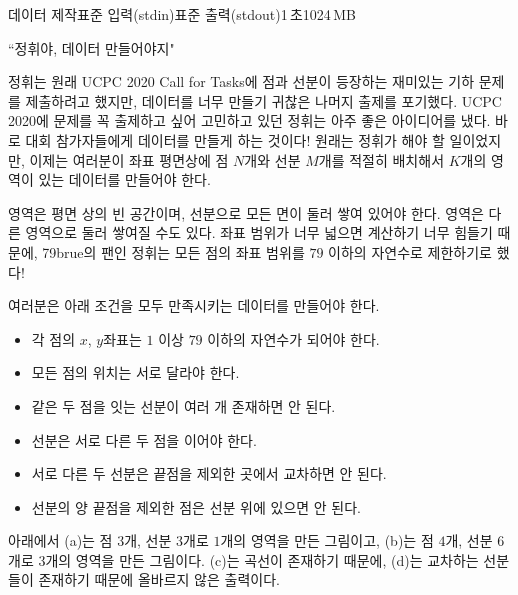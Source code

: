 \begin{problem}{데이터 제작}{표준 입력(stdin)}{표준 출력(stdout)}{1\,초}{1024\,MB}

\begin{flushright}
``정휘야, 데이터 만들어야지"
\end{flushright}

정휘는 원래 UCPC 2020 Call for Tasks에 점과 선분이 등장하는 재미있는 기하 문제를 제출하려고 했지만, 데이터를 너무 만들기 귀찮은 나머지 출제를 포기했다.
UCPC 2020에 문제를 꼭 출제하고 싶어 고민하고 있던 정휘는 아주 좋은 아이디어를 냈다. 바로 대회 참가자들에게 데이터를 만들게 하는 것이다! 원래는 정휘가 해야 할 일이었지만, 이제는 여러분이 좌표 평면상에 점 $N$개와 선분 $M$개를 적절히 배치해서 $K$개의 영역이 있는 데이터를 만들어야 한다.

영역은 평면 상의 빈 공간이며, 선분으로 모든 면이 둘러 쌓여 있어야 한다. 영역은 다른 영역으로 둘러 쌓여질 수도 있다. 좌표 범위가 너무 넓으면 계산하기 너무 힘들기 때문에, 79brue의 팬인 정휘는 모든 점의 좌표 범위를 $79$ 이하의 자연수로 제한하기로 했다!

여러분은 아래 조건을 모두 만족시키는 데이터를 만들어야 한다.

\begin{itemize}
\item 각 점의 $x$, $y$좌표는 $1$ 이상 $79$ 이하의 자연수가 되어야 한다.
\item 모든 점의 위치는 서로 달라야 한다.
\item 같은 두 점을 잇는 선분이 여러 개 존재하면 안 된다.
\item 선분은 서로 다른 두 점을 이어야 한다.
\item 서로 다른 두 선분은 끝점을 제외한 곳에서 교차하면 안 된다.
\item 선분의 양 끝점을 제외한 점은 선분 위에 있으면 안 된다.
\end{itemize}

아래에서 (a)는 점 $3$개, 선분 $3$개로 $1$개의 영역을 만든 그림이고, (b)는 점 $4$개, 선분 $6$개로 $3$개의 영역을 만든 그림이다. (c)는 곡선이 존재하기 때문에, (d)는 교차하는 선분들이 존재하기 때문에 올바르지 않은 출력이다.

\begin{figure}[h!]
\centering


\end{figure}
\end{problem}
